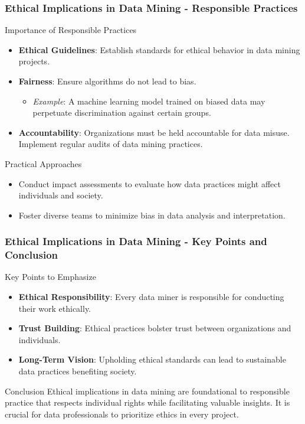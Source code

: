 \documentclass[aspectratio=169]{beamer}
\begin{document}
\begin{frame}[fragile]
    \frametitle{Ethical Implications in Data Mining - Responsible Practices}
    \begin{block}{Importance of Responsible Practices}
        \begin{itemize}
            \item \textbf{Ethical Guidelines}: Establish standards for ethical behavior in data mining projects.
            \item \textbf{Fairness}: Ensure algorithms do not lead to bias.
                \begin{itemize}
                    \item \textit{Example}: A machine learning model trained on biased data may perpetuate discrimination against certain groups.
                \end{itemize}
            \item \textbf{Accountability}: Organizations must be held accountable for data misuse. 
                Implement regular audits of data mining practices.
        \end{itemize}
    \end{block}
    \begin{block}{Practical Approaches}
        \begin{itemize}
            \item Conduct impact assessments to evaluate how data practices might affect individuals and society.
            \item Foster diverse teams to minimize bias in data analysis and interpretation.
        \end{itemize}
    \end{block}
\end{frame}

\begin{frame}[fragile]
    \frametitle{Ethical Implications in Data Mining - Key Points and Conclusion}
    \begin{block}{Key Points to Emphasize}
        \begin{itemize}
            \item \textbf{Ethical Responsibility}: Every data miner is responsible for conducting their work ethically.
            \item \textbf{Trust Building}: Ethical practices bolster trust between organizations and individuals.
            \item \textbf{Long-Term Vision}: Upholding ethical standards can lead to sustainable data practices benefiting society.
        \end{itemize}
    \end{block}
    \begin{block}{Conclusion}
        Ethical implications in data mining are foundational to responsible practice that respects individual rights while facilitating valuable insights. It is crucial for data professionals to prioritize ethics in every project.
    \end{block}
\end{frame}
\end{document}
